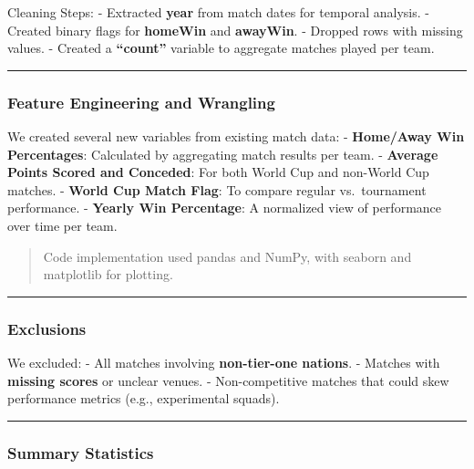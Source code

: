 \documentclass[
  letterpaper,
  DIV=11,
  numbers=noendperiod]{scrartcl}
\begin{document}
Cleaning Steps: - Extracted \textbf{year} from match dates for temporal
analysis. - Created binary flags for \textbf{homeWin} and
\textbf{awayWin}. - Dropped rows with missing values. - Created a
\textbf{``count''} variable to aggregate matches played per team.

\begin{center}\rule{0.5\linewidth}{0.5pt}\end{center}

\subsubsection{\texorpdfstring{\textbf{Feature Engineering and
Wrangling}}{Feature Engineering and Wrangling}}\label{feature-engineering-and-wrangling}

We created several new variables from existing match data: -
\textbf{Home/Away Win Percentages}: Calculated by aggregating match
results per team. - \textbf{Average Points Scored and Conceded}: For
both World Cup and non-World Cup matches. - \textbf{World Cup Match
Flag}: To compare regular vs.~tournament performance. - \textbf{Yearly
Win Percentage}: A normalized view of performance over time per team.

\begin{quote}
Code implementation used pandas and NumPy, with seaborn and matplotlib
for plotting.
\end{quote}

\begin{center}\rule{0.5\linewidth}{0.5pt}\end{center}

\subsubsection{\texorpdfstring{\textbf{Exclusions}}{Exclusions}}\label{exclusions}

We excluded: - All matches involving \textbf{non-tier-one nations}. -
Matches with \textbf{missing scores} or unclear venues. -
Non-competitive matches that could skew performance metrics (e.g.,
experimental squads).

\begin{center}\rule{0.5\linewidth}{0.5pt}\end{center}

\subsubsection{\texorpdfstring{\textbf{Summary
Statistics}}{Summary Statistics}}\label{summary-statistics}
\end{document}
